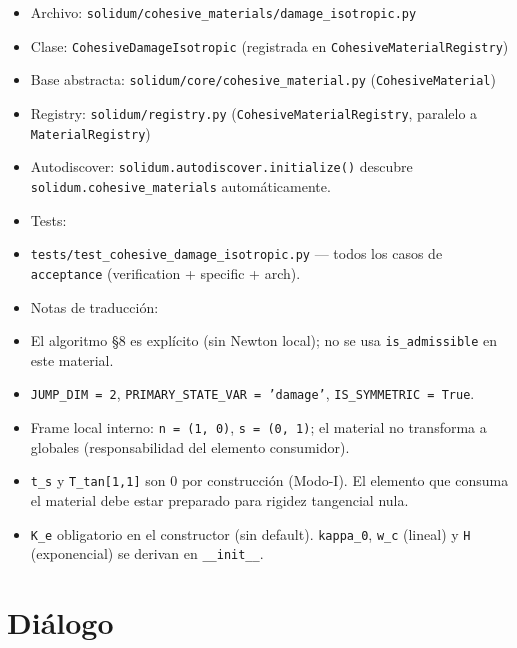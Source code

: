 \documentclass[11pt,letterpaper,oneside]{report}
\begin{document}
\begin{itemize}
  \item Archivo: \texttt{solidum/cohesive\_materials/damage\_isotropic.py}
  \item Clase: \texttt{CohesiveDamageIsotropic} (registrada en \texttt{CohesiveMaterialRegistry})
  \item Base abstracta: \texttt{solidum/core/cohesive\_material.py} (\texttt{CohesiveMaterial})
  \item Registry: \texttt{solidum/registry.py} (\texttt{CohesiveMaterialRegistry}, paralelo a \texttt{MaterialRegistry})
  \item Autodiscover: \texttt{solidum.autodiscover.initialize()} descubre \texttt{solidum.cohesive\_materials} automáticamente.
  \item Tests:
  \item \texttt{tests/test\_cohesive\_damage\_isotropic.py} --- todos los casos de \texttt{acceptance} (verification + specific + arch).
  \item Notas de traducción:
  \item El algoritmo §8 es explícito (sin Newton local); no se usa \texttt{is\_admissible} en este material.
  \item \texttt{JUMP\_DIM = 2}, \texttt{PRIMARY\_STATE\_VAR = 'damage'}, \texttt{IS\_SYMMETRIC = True}.
  \item Frame local interno: \texttt{n = (1, 0)}, \texttt{s = (0, 1)}; el material no transforma a globales (responsabilidad del elemento consumidor).
  \item \texttt{t\_s} y \texttt{T\_tan[1,1]} son 0 por construcción (Modo-I). El elemento que consuma el material debe estar preparado para rigidez tangencial nula.
  \item \texttt{K\_e} obligatorio en el constructor (sin default). \texttt{kappa\_0}, \texttt{w\_c} (lineal) y \texttt{H} (exponencial) se derivan en \texttt{\_\_init\_\_}.
\end{itemize}


\section{Diálogo}
\end{document}
